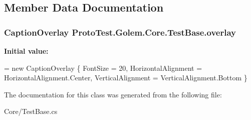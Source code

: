 \subsection{Member Data Documentation}
\hypertarget{class_proto_test_1_1_golem_1_1_core_1_1_test_base_a92e2848bbd216a93a200b88dadafdaaf}{
\subsubsection[{overlay}]{\setlength{\rightskip}{0pt plus 5cm}Caption\-Overlay Proto\-Test.\-Golem.\-Core.\-Test\-Base.\-overlay\hspace{0.3cm}{\ttfamily [static]}}}\label{class_proto_test_1_1_golem_1_1_core_1_1_test_base_a92e2848bbd216a93a200b88dadafdaaf}
{\bfseries Initial value\-:}
\begin{DoxyCode}
= \textcolor{keyword}{new} CaptionOverlay
        \{
            FontSize = 20,
            HorizontalAlignment = HorizontalAlignment.Center,
            VerticalAlignment = VerticalAlignment.Bottom
        \}
\end{DoxyCode}


The documentation for this class was generated from the following file\-:\begin{DoxyCompactItemize}
\item 
Core/Test\-Base.\-cs\end{DoxyCompactItemize}
